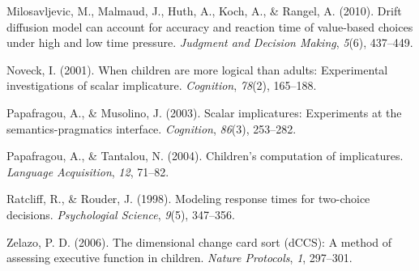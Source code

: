 \documentclass[10pt, letterpaper]{article}
\begin{document}
Milosavljevic, M., Malmaud, J., Huth, A., Koch, A., \& Rangel, A.
(2010). Drift diffusion model can account for accuracy and reaction time
of value-based choices under high and low time pressure. \emph{Judgment
and Decision Making}, \emph{5}(6), 437--449.

Noveck, I. (2001). When children are more logical than adults:
Experimental investigations of scalar implicature. \emph{Cognition},
\emph{78}(2), 165--188.

Papafragou, A., \& Musolino, J. (2003). Scalar implicatures: Experiments
at the semantics-pragmatics interface. \emph{Cognition}, \emph{86}(3),
253--282.

Papafragou, A., \& Tantalou, N. (2004). Children's computation of
implicatures. \emph{Language Acquisition}, \emph{12}, 71--82.

Ratcliff, R., \& Rouder, J. (1998). Modeling response times for
two-choice decisions. \emph{Psychologial Science}, \emph{9}(5),
347--356.

Zelazo, P. D. (2006). The dimensional change card sort (dCCS): A method
of assessing executive function in children. \emph{Nature Protocols},
\emph{1}, 297--301.
\end{document}

